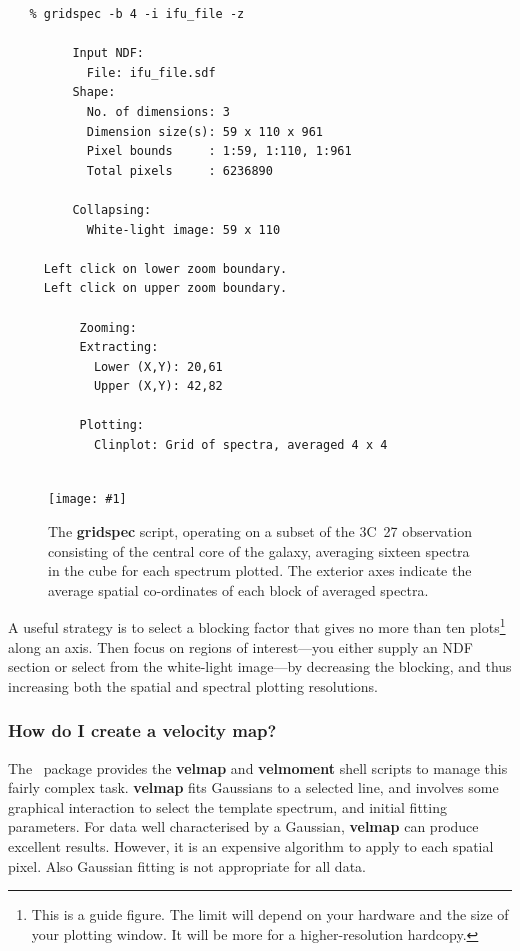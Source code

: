 \documentclass[twoside,11pt]{article}
\newcommand{\htmladdimg}[1]{}
\newcommand{\xref}[3]{#1}
\newcommand{\xlabel}[1]{}
\newcommand{\myfig} [5] {
  \begin{figure}[thb]
    \centering\texttt{[image: \#1]}
    \typeout{#1 inserted on page \arabic{page}}
    \caption{\label{#4}#5}
  \end{figure}
  }
\newcommand{\myfig}[5]{
    \label{#4} \htmladdimg{#3}\\
    Figure: #5\\
    }
\begin{document}
{\small\begin{verbatim}
   % gridspec -b 4 -i ifu_file -z

         Input NDF:
           File: ifu_file.sdf
         Shape:
           No. of dimensions: 3
           Dimension size(s): 59 x 110 x 961
           Pixel bounds     : 1:59, 1:110, 1:961
           Total pixels     : 6236890

         Collapsing:
           White-light image: 59 x 110

     Left click on lower zoom boundary.
     Left click on upper zoom boundary.

          Zooming:
          Extracting:
            Lower (X,Y): 20,61
            Upper (X,Y): 42,82

          Plotting:
            Clinplot: Grid of spectra, averaged 4 x 4
               
\end{verbatim}\normalsize

\myfig{sc16_gridspec.eps}{height=0.5\textheight}{sc16_gridspec.gif}{sc16_gridspec_fig}{The
{\bf gridspec} script, operating on a subset of the 3C~27 observation
consisting of the central core of the galaxy, averaging sixteen
spectra in the cube for each spectrum plotted.  The exterior axes
indicate the average spatial co-ordinates of each block of averaged
spectra.}

A useful strategy is to select a blocking factor that gives no more
than ten plots\footnote{This is a guide figure.  The limit will
depend on your hardware and the size of your plotting window.  It will
be more for a higher-resolution hardcopy.} along an axis.  Then focus
on regions of interest---you either supply an NDF section or select
from the white-light image---by decreasing the blocking, and thus
increasing both the spatial and spectral plotting resolutions.


\subsubsection{\label{sc16_velmap}How do I create a velocity map?\xlabel{sc16_velmap}}

The \DATACUBE\ package provides the \xref{{\bf
velmap}}{sun237}{velmap} and \xref{{\bf velmoment}}{sun237}{velmoment}
shell scripts to manage this fairly complex task.  {\bf velmap} fits
Gaussians to a selected line, and involves some graphical interaction
to select the template spectrum, and initial fitting parameters. For
data well characterised by a Gaussian, {\bf velmap} can produce
excellent results.  However, it is an expensive algorithm to apply to
each spatial pixel.  Also Gaussian fitting is not appropriate for all
data. 

}
\end{document}
